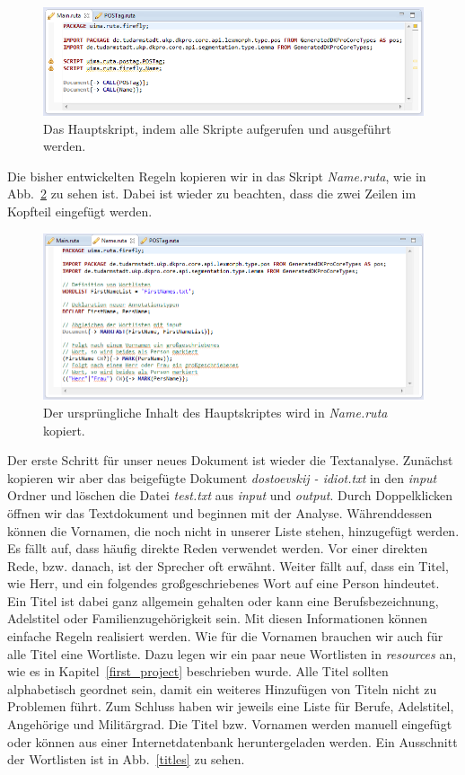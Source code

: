 \documentclass{article}
\begin{document}
\begin{figure}
\centering
\includegraphics[width=1\textwidth]{figs/tt_main.png}
\caption{Das Hauptskript, indem alle Skripte aufgerufen und ausgeführt werden.}
\label{main}
\end{figure}

Die bisher entwickelten Regeln kopieren wir in das Skript \textit{Name.ruta}, wie in Abb.~\ref{name} zu sehen ist. Dabei ist wieder zu beachten, dass die zwei Zeilen im Kopfteil eingefügt werden.

\begin{figure}
\centering
\includegraphics[width=1\textwidth]{figs/tt_name.png}
\caption{Der ursprüngliche Inhalt des Hauptskriptes wird in \textit{Name.ruta} kopiert.}
\label{name}
\end{figure}

Der erste Schritt für unser neues Dokument ist wieder die Textanalyse. Zunächst kopieren wir aber das beigefügte Dokument \textit{dostoevskij - idiot.txt} in den \textit{input} Ordner und löschen die Datei \textit{test.txt} aus \textit{input} und \textit{output}. Durch Doppelklicken öffnen wir das Textdokument und beginnen mit der Analyse. Währenddessen können die Vornamen, die noch nicht in unserer Liste stehen, hinzugefügt werden. Es fällt auf, dass häufig direkte Reden verwendet werden. Vor einer direkten Rede, bzw. danach, ist der Sprecher oft erwähnt. Weiter fällt auf, dass ein Titel, wie \glqq Herr\grqq{}, und ein folgendes großgeschriebenes Wort auf eine Person hindeutet. Ein Titel ist dabei ganz allgemein gehalten oder kann eine Berufsbezeichnung, Adelstitel oder Familienzugehörigkeit sein. Mit diesen Informationen können einfache Regeln realisiert werden. Wie für die Vornamen brauchen wir auch für alle Titel eine Wortliste. Dazu legen wir ein paar neue Wortlisten in \textit{resources} an, wie es in Kapitel~\ref{first_project} beschrieben wurde. Alle Titel sollten alphabetisch geordnet sein, damit ein weiteres Hinzufügen von Titeln nicht zu Problemen führt. Zum Schluss haben wir jeweils eine Liste für Berufe, Adelstitel, Angehörige und Militärgrad. Die Titel bzw. Vornamen werden manuell eingefügt oder können aus einer Internetdatenbank heruntergeladen werden. Ein Ausschnitt der Wortlisten ist in Abb.~\ref{titles} zu sehen.
\end{document}
